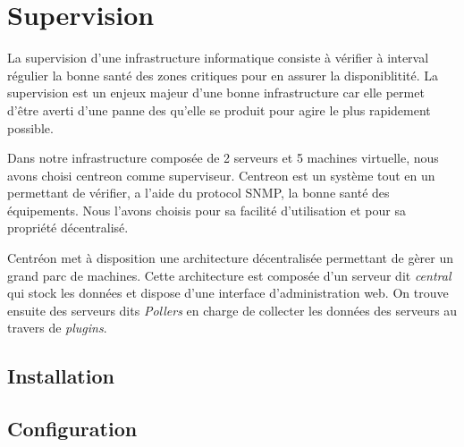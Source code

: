 \section{Supervision}

La supervision d'une infrastructure informatique consiste à vérifier à interval régulier la bonne santé des zones critiques pour en assurer la disponiblitité.
La supervision est un enjeux majeur d'une bonne infrastructure car elle permet d'être averti d'une panne des qu'elle se produit pour agire le plus rapidement possible.

Dans notre infrastructure composée de 2 serveurs et 5 machines virtuelle, nous avons choisi centreon comme superviseur.
Centreon est un système tout en un permettant de vérifier, a l'aide du protocol SNMP, la bonne santé des équipements.
Nous l'avons choisis pour sa facilité d'utilisation et pour sa propriété décentralisé.

Centréon met à disposition une architecture décentralisée permettant de gèrer un grand parc de machines.
Cette architecture est composée d'un serveur dit \emph{central} qui stock les données et dispose d'une interface d'administration web.
On trouve ensuite des serveurs dits \emph{Pollers} en charge de collecter les données des serveurs au travers de \emph{plugins}.

	\subsection{Installation}
	\subsection{Configuration}
	